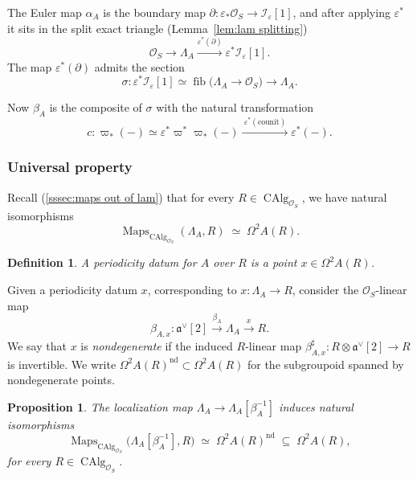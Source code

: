 \documentclass[12pt, oneside]{amsart}
\numberwithin{equation}{section}
\newtheorem{proposition}[subsubsection]{Proposition}
\newtheorem{definition}[subsubsection]{Definition}
\theoremstyle{remark}
\theoremstyle{plain}
\DeclareMathOperator{\Map}{Maps}
\newcommand{\frav}{\mathfrak{a}^\vee}
\newcommand{\lam}{\Lambda}
\newcommand{\OO}{\mathcal{O}}
\newcommand{\CAlg}{\operatorname{CAlg}}
\newcommand{\eps}{\varepsilon}
\begin{document}
The Euler map $\alpha_A$ is the boundary map $\partial : \eps_* \OO_S \to \mathcal{I}_\eps [1]$, and after applying $\eps^*$ it sits in the split exact triangle (Lemma~\ref{lem:lam splitting})
\[
  \OO_S
  \to \lam_A
  \xrightarrow{\eps^*(\partial)} \eps^* \mathcal{I}_{\eps}[1].
\]
The map $\eps^*(\partial)$ admits the section
\begin{equation}\label{eq:sigma RA}
  \sigma : \eps^*\mathcal{I}_{\eps}[1]
  \simeq \operatorname{fib}\bigl(\lam_A \to \OO_S\bigr)
  \longrightarrow \lam_A.
\end{equation}

Now $\beta_A$ is the composite of $\sigma$ with the natural transformation
\begin{equation}\label{eq:c RA}
  c : \varpi_{*}(-)
  \simeq \eps^* \varpi^* \varpi_{*}(-) \xrightarrow{\ \eps^*(\mathrm{counit})\ } \eps^*(-).
\end{equation}

\subsubsection{Universal property}

Recall (\ref{sssec:maps out of lam}) that for every $R \in \CAlg_{\OO_S}$, we have natural isomorphisms
\begin{equation*}
	\Map_{\CAlg_{\OO_S}}(\lam_A, R) \;\simeq\; \Omega^2 A(R).
\end{equation*}

\begin{definition}\label{def:periodicity datum}
  A \emph{periodicity datum} for $A$ over $R$ is a point $x \in \Omega^2 A(R)$.
\end{definition}

Given a periodicity datum $x$, corresponding to $x : \lam_A \to R$, consider the $\OO_S$-linear map
\[
  \beta_{A,x} : \frav[2] \xrightarrow{\beta_A} \lam_A \xrightarrow{x} R.
\]
We say that $x$ is \emph{nondegenerate} if the induced $R$-linear map $\beta_{A,x}^{\sharp} : R \otimes \frav[2] \to R$ is invertible.
We write $\Omega^2 A(R)^{\mathrm{nd}} \subset \Omega^2 A(R)$ for the subgroupoid spanned by nondegenerate points.

\begin{proposition}\label{prop:bott per univ prop}
  The localization map $\lam_A \to \lam_A[\beta_A^{-1}]$ induces natural isomorphisms
  \[
    \Map_{\CAlg_{\OO_S}}\bigl(\lam_A[\beta_A^{-1}], R\bigr)
    \;\simeq\;
    \Omega^2 A(R)^{\mathrm{nd}}
    \;\subseteq\; \Omega^2 A(R),
  \]
	for every $R \in \CAlg_{\OO_S}$.
\end{proposition}
\end{document}
